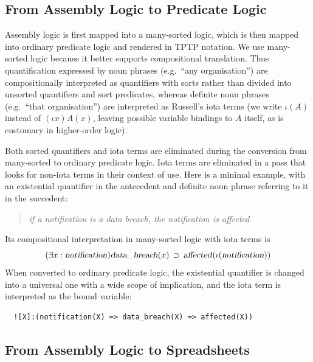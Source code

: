 \documentclass{IOS-Book-Article}
\newcommand{\eop}[1]{\mbox{\textsl{#1}}}
\newcommand{\bequ}{\begin{quote}}
\newcommand{\enqu}{\end{quote}}
\begin{document}
\subsection{From Assembly Logic to Predicate Logic}
\label{sec:predicate-logic}

Assembly logic is first mapped into a many-sorted logic, which is then mapped into ordinary predicate logic and rendered in TPTP \cite{sutcliffe2009tptp} notation. 
We use many-sorted logic because it better supports compositional translation.
Thus quantification expressed by noun phrases (e.g.\ ``any organisation'') are compositionally interpreted as quantifiers with sorts rather than divided into unsorted quantifiers and sort predicates, whereas definite noun phrases  (e.g.\ ``that organisation'') are interpreted as Russell's iota terms (we write $\iota(A)$ instead of $(\iota x)A(x)$, leaving possible variable bindings to $A$ itself, as is customary in higher-order logic).

Both sorted quantifiers and iota terms are eliminated during the conversion from many-sorted to ordinary predicate logic.
Iota terms are eliminated in a pass that looks for non-iota terms in their context of use.
Here is a minimal example, with an existential quantifier in the antecedent and definite noun phrase referring to it in the succedent:
\bequ
        \textit{if a notification is a data breach, the notification is affected}
 \enqu
Its compositional interpretation in many-sorted logic with iota terms is
\[
(\exists x : \eop{notification})\eop{data\_breach}(x) \, \supset \, \eop{affected}(\iota(\eop{notification}))
\]
When converted to ordinary predicate logic, the existential quantifier is changed into a universal one with a wide scope of implication, and the iota term is interpreted as the bound variable:
\begin{verbatim}
  ![X]:(notification(X) => data_breach(X) => affected(X))
\end{verbatim}
%

\subsection{From Assembly Logic to Spreadsheets}
\label{sec:vis:spreadsheets}
\end{document}
